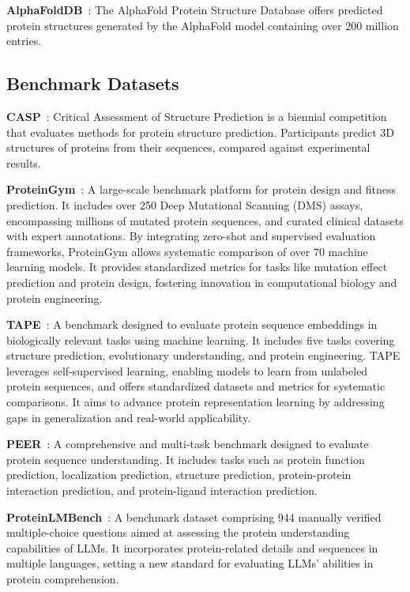 \smallskip \noindent \textbf{AlphaFoldDB}~\cite{tunyasuvunakool2021highly}: The AlphaFold Protein Structure Database offers predicted protein structures generated by the AlphaFold model containing over 200 million entries.

\subsection{Benchmark Datasets}

\smallskip \noindent \textbf{CASP}~\cite{kryshtafovych2019critical}: Critical Assessment of Structure Prediction is a biennial competition that evaluates methods for protein structure prediction. Participants predict 3D structures of proteins from their sequences, compared against experimental results.

\smallskip \noindent \textbf{ProteinGym}~\cite{notin2024proteingym}: A large-scale benchmark platform for protein design and fitness prediction. It includes over 250 Deep Mutational Scanning (DMS) assays, encompassing millions of mutated protein sequences, and curated clinical datasets with expert annotations. By integrating zero-shot and supervised evaluation frameworks, ProteinGym allows systematic comparison of over 70 machine learning models. It provides standardized metrics for tasks like mutation effect prediction and protein design, fostering innovation in computational biology and protein engineering.

\smallskip \noindent \textbf{TAPE}~\cite{rao2019evaluating}: A benchmark designed to evaluate protein sequence embeddings in biologically relevant tasks using machine learning. It includes five tasks covering structure prediction, evolutionary understanding, and protein engineering. TAPE leverages self-supervised learning, enabling models to learn from unlabeled protein sequences, and offers standardized datasets and metrics for systematic comparisons. It aims to advance protein representation learning by addressing gaps in generalization and real-world applicability.

\smallskip \noindent \textbf{PEER}~\cite{xu2022peer}: A comprehensive and multi-task benchmark designed to evaluate protein sequence understanding. It includes tasks such as protein function prediction, localization prediction, structure prediction, protein-protein interaction prediction, and protein-ligand interaction prediction. 

\smallskip \noindent \textbf{ProteinLMBench}~\cite{shen2024fine}: A benchmark dataset comprising 944 manually verified multiple-choice questions aimed at assessing the protein understanding capabilities of LLMs. It incorporates protein-related details and sequences in multiple languages, setting a new standard for evaluating LLMs’ abilities in protein comprehension.

